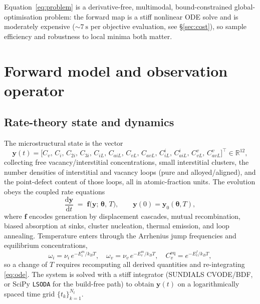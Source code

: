 \documentclass[11pt]{article}
\newcommand{\R}{\mathbb{R}}
\newcommand{\param}{\bm{\theta}}
\begin{document}
Equation~\eqref{eq:problem} is a derivative-free, multimodal, bound-constrained
global-optimisation problem: the forward map is a stiff nonlinear ODE solve and is
moderately expensive (\(\sim\!\SI{7}{\second}\) per objective evaluation, see
\S\ref{sec:cost}), so sample efficiency and robustness to local minima both matter.

\section{Forward model and observation operator}
\subsection{Rate-theory state and dynamics}
The microstructural state is the vector
\begin{equation}
  \bm{y}(t)=\big[C_v,\,C_i,\,C_{2i},\,C_{3i},\,
  C_{iL},\,C_{aiL},\,C_{vL},\,C_{avL},\,
  C_{iL}^{i},\,C_{aiL}^{i},\,C_{vL}^{v},\,C_{avL}^{v}\big]^{\!\top}\in\R^{12},
\end{equation}
collecting free vacancy/interstitial concentrations, small interstitial clusters,
the number densities of interstitial and vacancy loops (pure and alloyed/aligned),
and the point-defect content of those loops, all in atomic-fraction units. The
evolution obeys the coupled rate equations
\begin{equation}
  \frac{\mathrm{d}\bm{y}}{\mathrm{d}t}
  \;=\;\bm{f}\!\big(\bm{y};\,\param,\,T\big),
  \qquad \bm{y}(0)=\bm{y}_0(\param,T),
  \label{eq:ode}
\end{equation}
where $\bm{f}$ encodes generation by displacement cascades, mutual recombination,
biased absorption at sinks, cluster nucleation, thermal emission, and loop
annealing. Temperature enters through the Arrhenius jump frequencies and
equilibrium concentrations,
\begin{equation}
  \omega_{i}=\nu_i\,e^{-E^m_i/k_BT},\quad
  \omega_{v}=\nu_v\,e^{-E^m_v/k_BT},\quad
  C_v^{\mathrm{eq}}=e^{-E^f_v/k_BT},
  \label{eq:arrhenius}
\end{equation}
so a change of $T$ requires recomputing all derived quantities and re-integrating
\eqref{eq:ode}. The system is solved with a stiff integrator (SUNDIALS CVODE/BDF,
or SciPy \texttt{LSODA} for the build-free path) to obtain $\bm{y}(t)$ on a
logarithmically spaced time grid $\{t_k\}_{k=1}^{N_t}$.
\end{document}
